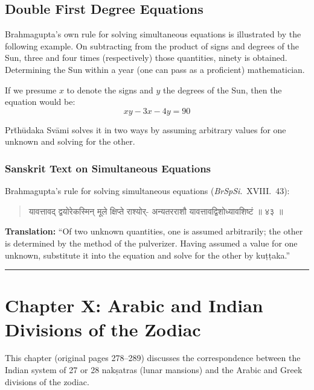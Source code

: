 \documentclass[11pt,a4paper]{article}
\newcommand{\longline}{\noindent\rule{\textwidth}{0.4pt}}
\newcommand{\dev}[1]{{\devanagarifont #1}}
\newenvironment{sanskritverse}{%
  \begin{quote}
  \devanagarifont
  \small
  \color{titlecolor}
}{\end{quote}}
\theoremstyle{definition}
\begin{document}
\vspace{0.3cm}

\subsection{Double First Degree Equations}

Brahmagupta's own rule for solving simultaneous equations is illustrated by the following example. On subtracting from the product of signs and degrees of the Sun, three and four times (respectively) those quantities, ninety is obtained. Determining the Sun within a year (one can pass as a proficient) mathematician.

If we presume $x$ to denote the signs and $y$ the degrees of the Sun, then the equation would be:
\[
xy - 3x - 4y = 90
\]

Pr\=th\=udaka Sv\=ami solves it in two ways by assuming arbitrary values for one unknown and solving for the other.


\subsubsection{Sanskrit Text on Simultaneous Equations}

Brahmagupta's rule for solving simultaneous equations (\textit{BrSpSi}.\ XVIII.\ 43):

\begin{sanskritverse}
\dev{यावत्तावद् द्वयोरेकस्मिन् मूले क्षिप्ते राश्योर्-}
\dev{अन्यतरराशौ यावत्तावद्विशोध्यावशिष्टं ॥ ४३ ॥}
\end{sanskritverse}

\textbf{Translation:} ``Of two unknown quantities, one is assumed arbitrarily; the other is determined by the method of the pulverizer. Having assumed a value for one unknown, substitute it into the equation and solve for the other by ku\d{t}\d{t}aka.''

\vspace{0.3cm}
\longline

\section{Chapter X: Arabic and Indian Divisions of the Zodiac}
\label{sec:zodiac}

This chapter (original pages 278--289) discusses the correspondence between the Indian system of 27 or 28 nak\d{s}atras (lunar mansions) and the Arabic and Greek divisions of the zodiac.
\end{document}
